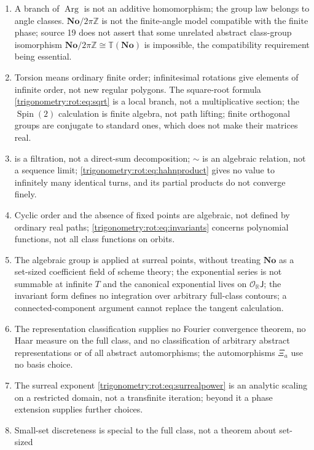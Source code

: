\documentclass[11pt,letterpaper]{article}
\numberwithin{equation}{section}
\theoremstyle{definition}
\theoremstyle{remark}
\newcommand{\No}{\mathbf{No}}
\newcommand{\R}{\mathbb R}
\newcommand{\Z}{\mathbb Z}
\newcommand{\OO}{\mathcal O}
\newcommand{\TT}{\mathbb T}
\newcommand{\Arg}{\operatorname{Arg}}
\begin{document}
\begin{enumerate}
\begin{enumerate}[label=(\alph*),itemsep=0.2em]
  arbitrary series with surreal coefficients need not be evaluable at every infinitesimal. Strong sums
  are not limits of partial sums in the fine topology.
 \item A branch of $\Arg$ is not an additive homomorphism; the group law belongs to angle classes.
  $\No/2\pi\Z$ is not the finite-angle model compatible with the finite phase; source 19 does not
  assert that some unrelated abstract class-group isomorphism $\No/2\pi\Z\cong\TT(\No)$ is impossible,
  the compatibility requirement being essential.
 \item Torsion means ordinary finite order; infinitesimal rotations give elements of infinite order,
  not new regular polygons. The square-root formula \cref{trigonometry:rot:eq:sqrt} is a local branch,
  not a multiplicative section; the $\operatorname{Spin}(2)$ calculation is finite algebra, not path
  lifting; finite orthogonal groups are conjugate to standard ones, which does not make their matrices
  real.
 \item {} is a filtration, not a direct-sum decomposition; $\sim$ is an
  algebraic relation, not a sequence limit; \cref{trigonometry:rot:eq:hahnproduct} gives no value to
  infinitely many identical turns, and its partial products do not converge finely.
 \item Cyclic order and the absence of fixed points are algebraic, not defined by ordinary real paths;
  \cref{trigonometry:rot:eq:invariants} concerns polynomial functions, not all class functions on
  orbits.
 \item The algebraic group is applied at surreal points, without treating $\No$ as a set-sized
  coefficient field of scheme theory; the exponential series is not summable at infinite $T$ and the
  canonical exponential lives on $\OO_{\R}\mathsf J$; the invariant form defines no integration over
  arbitrary full-class contours; a connected-component argument cannot replace the tangent
  calculation.
 \item The representation classification supplies no Fourier convergence theorem, no Haar measure on
  the full class, and no classification of arbitrary abstract representations or of all abstract
  automorphisms; the automorphisms $\Xi_a$ use no basis choice.
 \item The surreal exponent \cref{trigonometry:rot:eq:surrealpower} is an analytic scaling on a
  restricted domain, not a transfinite iteration; beyond it a phase extension supplies further choices.
 \item Small-set discreteness is special to the full class, not a theorem about set-sized

\end{enumerate}
\end{enumerate}
\end{document}
